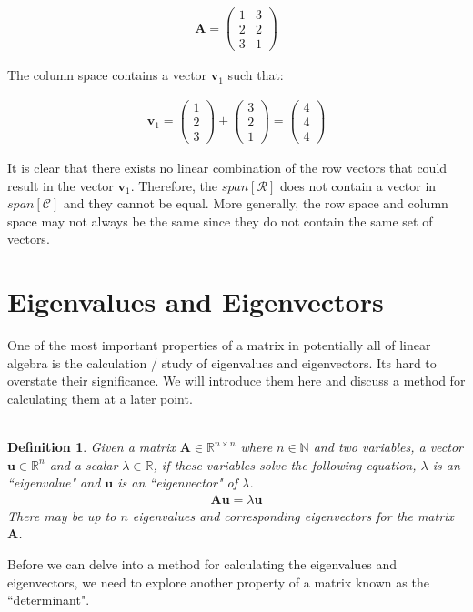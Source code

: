\documentclass[a4paper,12pt]{book}
\newcommand{\set}[1]{\mathcal{#1}}
\newcommand{\matrx}[1]{\bm{#1}}
\newcommand{\vectr}[1]{\textbf{#1}}
\newcommand{\real}{\mathbb{R}}
\newcommand{\natral}{\mathbb{N}}
\newtheorem{definition}{Definition}[section]
\begin{document}
	\begin{align}
		\matrx{A} = \begin{pmatrix}
			1 & 3 \\
			2 & 2 \\
			3 & 1 
		\end{pmatrix}
	\end{align} 

	The column space contains a vector $ \vectr{v}_1 $ such that:
	
	\begin{align}
		\vectr{v}_1 = \begin{pmatrix}
			1 \\
			2 \\
			3 
		\end{pmatrix} + \begin{pmatrix}
		3 \\
		2 \\
		1 
	\end{pmatrix} = \begin{pmatrix}
		4 \\
		4 \\
		4 
	\end{pmatrix}
 	\end{align}
	
	It is clear that there exists no linear combination of the row vectors that could result in the vector $ \vectr{v}_1 $. Therefore, the $ span[\set{R}] $ does not contain a vector in $ span[\set{C}] $ and they cannot be equal. More generally, the row space and column space may not always be the same since they do not contain the same set of vectors. 
	\section{Eigenvalues and Eigenvectors} \label{sec:eigen}
	One of the most important properties of a matrix in potentially all of linear algebra is the calculation / study of eigenvalues and eigenvectors. Its hard to overstate their significance. We will introduce them here and discuss a method for calculating them at a later point. 
	\\\\
	\begin{definition}
		\normalfont Given a matrix $ \matrx{A} \in \real^{n \times n} $ where $ n \in \natral $ and two variables, a vector $ \vectr{u} \in \real^{n} $ and a scalar $ \lambda \in \real $, if these variables solve the following equation, $ \lambda $ is an ``eigenvalue" and $ \vectr{u} $ is an ``eigenvector" of $ \lambda $.
		\begin{align}
			\matrx{A} \vectr{u} = \lambda \vectr{u}
		\end{align}
		There may be up to $ n $ eigenvalues and corresponding eigenvectors for the matrix $ \matrx{A} $.
		\label{def:eigenvalue_eigenvector} 
	\end{definition} 
	Before we can delve into a method for calculating the eigenvalues and eigenvectors, we need to explore another property of a matrix known as the ``determinant".
	
\end{document}
